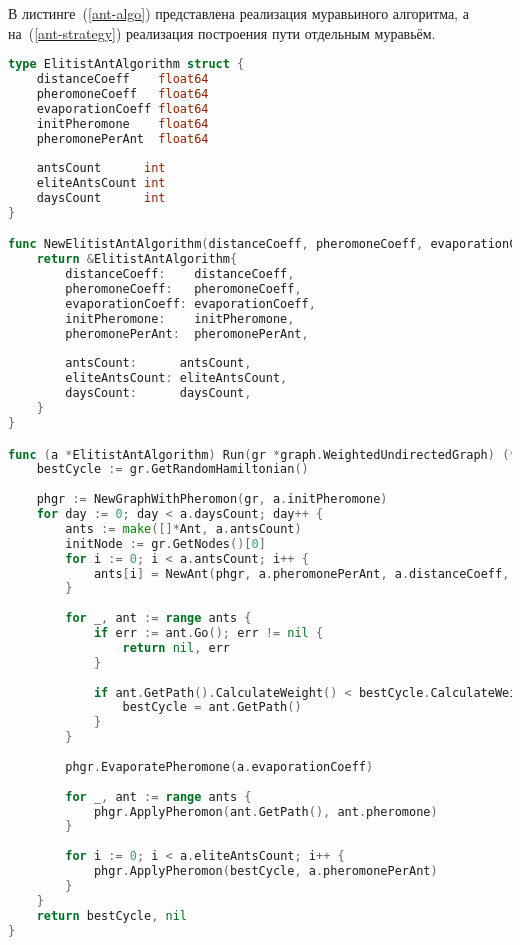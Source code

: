 В листинге~(\ref{ant-algo}) представлена реализация муравьиного алгоритма, а на~(\ref{ant-strategy}) реализация построения пути отдельным муравьём.

\begin{lstlisting}[label=ant-algo,caption={Муравьиный алгоритм},language=go]
type ElitistAntAlgorithm struct {
	distanceCoeff    float64
	pheromoneCoeff   float64
	evaporationCoeff float64
	initPheromone    float64
	pheromonePerAnt  float64
	
	antsCount      int
	eliteAntsCount int
	daysCount      int
}

func NewElitistAntAlgorithm(distanceCoeff, pheromoneCoeff, evaporationCoeff, initPheromone, pheromonePerAnt float64, antsCount, eliteAntsCount, daysCount int) *ElitistAntAlgorithm {
	return &ElitistAntAlgorithm{
		distanceCoeff:    distanceCoeff,
		pheromoneCoeff:   pheromoneCoeff,
		evaporationCoeff: evaporationCoeff,
		initPheromone:    initPheromone,
		pheromonePerAnt:  pheromonePerAnt,
		
		antsCount:      antsCount,
		eliteAntsCount: eliteAntsCount,
		daysCount:      daysCount,
	}
}

func (a *ElitistAntAlgorithm) Run(gr *graph.WeightedUndirectedGraph) (*graph.WeightedCycle, error) {
	bestCycle := gr.GetRandomHamiltonian()
	
	phgr := NewGraphWithPheromon(gr, a.initPheromone)
	for day := 0; day < a.daysCount; day++ {
		ants := make([]*Ant, a.antsCount)
		initNode := gr.GetNodes()[0]
		for i := 0; i < a.antsCount; i++ {
			ants[i] = NewAnt(phgr, a.pheromonePerAnt, a.distanceCoeff, a.pheromoneCoeff, initNode)
		}
		
		for _, ant := range ants {
			if err := ant.Go(); err != nil {
				return nil, err
			}
			
			if ant.GetPath().CalculateWeight() < bestCycle.CalculateWeight() {
				bestCycle = ant.GetPath()
			}
		}
		
		phgr.EvaporatePheromone(a.evaporationCoeff)
		
		for _, ant := range ants {
			phgr.ApplyPheromon(ant.GetPath(), ant.pheromone)
		}
		
		for i := 0; i < a.eliteAntsCount; i++ {
			phgr.ApplyPheromon(bestCycle, a.pheromonePerAnt)
		}
	}
	return bestCycle, nil
}
\end{lstlisting}

